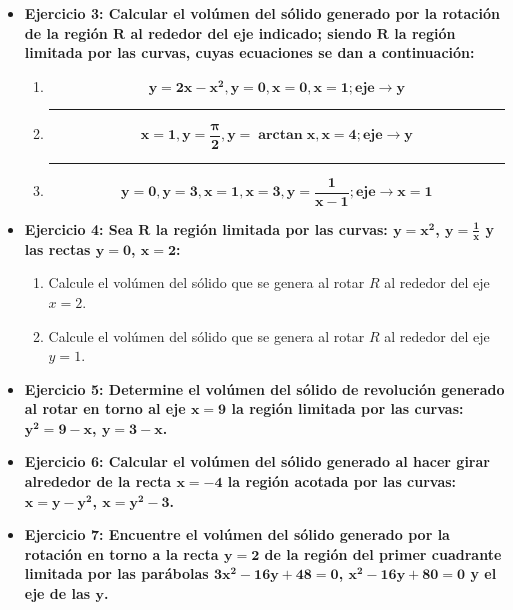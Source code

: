 \documentclass[12pt]{article}
\begin{document}
\begin{itemize}
        \item \textbf{Ejercicio 3: Calcular el volúmen del sólido generado por la rotación de la región $\bm{R}$ al rededor del eje indicado; siendo $\bm{R}$ la región limitada por las curvas, cuyas ecuaciones se dan a continuación:} \vspace{0.5cm}
            \begin{enumerate}[label=\alph*.]
                \hrule
                \item \[\bm{y = 2x - x^2, y = 0, x = 0, x = 1; eje \rightarrow y}\]
                
                \hrule
                \item \[\bm{x = 1, y = \frac{\pi}{2}, y = \arctan{x}, x = 4; eje \rightarrow y}\]
                
                \hrule
                \item \[\bm{y = 0, y = 3, x = 1, x = 3, y = \frac{1}{x - 1}; eje \rightarrow x = 1}\]
                
            \end{enumerate}
        
        \item \textbf{Ejercicio 4: Sea $\bm{R}$ la región limitada por las curvas: $\bm{y = x^2}$, $\bm{y = \frac{1}{x}}$ y las rectas $\bm{y = 0}$, $\bm{x = 2}$:}
            \begin{enumerate}[label=\alph*)]
                \item Calcule el volúmen del sólido que se genera al rotar $R$ al rededor del eje $x = 2$.
                \item Calcule el volúmen del sólido que se genera al rotar $R$ al rededor del eje $y = 1$.
            \end{enumerate}
        
        
        \item \textbf{Ejercicio 5: Determine el volúmen del sólido de revolución generado al rotar en torno al eje $\bm{x = 9}$ la región limitada por las curvas: $\bm{y^2 = 9 - x}$, $\bm{y = 3 - x}$.}
        
        
        \item \textbf{Ejercicio 6: Calcular el volúmen del sólido generado al hacer girar alrededor de la recta $\bm{x = -4}$ la región acotada por las curvas: $\bm{x = y - y^2}$, $\bm{x = y^2 - 3}$.}
        
        
        \item \textbf{Ejercicio 7: Encuentre el volúmen del sólido generado por la rotación en torno a la recta $\bm{y = 2}$ de la región del primer cuadrante limitada por las parábolas $\bm{3x^2 - 16y + 48 = 0}$, $\bm{x^2 - 16y + 80 = 0}$ y el eje de las $\bm{y}$.}
        

\end{itemize}
\end{document}
